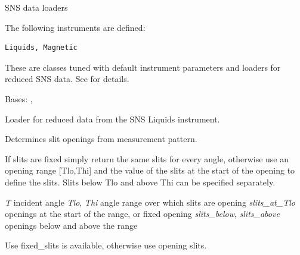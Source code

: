 \documentclass[letterpaper,10pt,english]{sphinxmanual}
\begin{document}
\label{api/snsdata:module-refl1d.snsdata}
SNS data loaders

The following instruments are defined:

\begin{Verbatim}[commandchars=@\[\]]
Liquids, Magnetic
\end{Verbatim}

These are  classes tuned with
default instrument parameters and loaders for reduced SNS data.
See  for details.

\begin{fulllineitems}
\label{api/snsdata:refl1d.snsdata.Liquids}
Bases: {\hyperref[api/snsdata:refl1d.snsdata.SNSData]{}}, {\hyperref[api/instrument:refl1d.instrument.Pulsed]{}}

Loader for reduced data from the SNS Liquids instrument.

\begin{fulllineitems}
\label{api/snsdata:refl1d.snsdata.Liquids.calc_dT}
\end{fulllineitems}


\begin{fulllineitems}
\label{api/snsdata:refl1d.snsdata.Liquids.calc_slits}
Determines slit openings from measurement pattern.

If slits are fixed simply return the same slits for every angle,
otherwise use an opening range {[}Tlo,Thi{]} and the value of the
slits at the start of the opening to define the slits.  Slits
below Tlo and above Thi can be specified separately.

\emph{T}              incident angle
\emph{Tlo}, \emph{Thi}     angle range over which slits are opening
\emph{slits\_at\_Tlo}   openings at the start of the range, or fixed opening
\emph{slits\_below}, \emph{slits\_above}   openings below and above the range

Use fixed\_slits is available, otherwise use opening slits.


\end{fulllineitems}
\end{fulllineitems}
\end{document}
